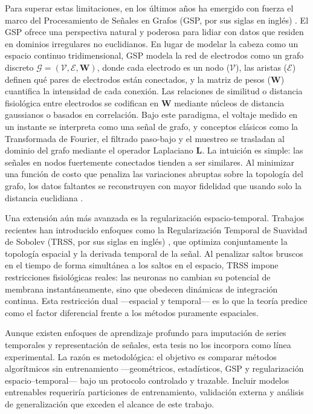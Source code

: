 Para superar estas limitaciones, en los últimos años ha emergido con fuerza el marco del Procesamiento de Señales en Grafos (GSP, por sus siglas en inglés) \cite{shuman2013,ortega2018}. El GSP ofrece una perspectiva natural y poderosa para lidiar con datos que residen en dominios irregulares no euclidianos. En lugar de modelar la cabeza como un espacio continuo tridimensional, GSP modela la red de electrodos como un grafo discreto $\mathcal{G} = (\mathcal{V}, \mathcal{E}, \mathbf{W})$, donde cada electrodo es un nodo ($\mathcal{V}$), las aristas ($\mathcal{E}$) definen qué pares de electrodos están conectados, y la matriz de pesos ($\mathbf{W}$) cuantifica la intensidad de cada conexión. Las relaciones de similitud o distancia fisiológica entre electrodos se codifican en $\mathbf{W}$ mediante núcleos de distancia gaussianos o basados en correlación.
Bajo este paradigma, el voltaje medido en un instante se interpreta como una señal de grafo, y conceptos clásicos como la Transformada de Fourier, el filtrado paso-bajo y el muestreo se trasladan al dominio del grafo mediante el operador Laplaciano $\mathbf{L}$. La intuición es simple: las señales en nodos fuertemente conectados tienden a ser similares. Al minimizar una función de costo que penaliza las variaciones abruptas sobre la topología del grafo, los datos faltantes se reconstruyen con mayor fidelidad que usando solo la distancia euclidiana \cite{narang2013}.

Una extensión aún más avanzada es la regularización espacio-temporal. Trabajos recientes han introducido enfoques como la Regularización Temporal de Suavidad de Sobolev (TRSS, por sus siglas en inglés) \cite{giraldo2022}, que optimiza conjuntamente la topología espacial y la derivada temporal de la señal. Al penalizar saltos bruscos en el tiempo de forma simultánea a los saltos en el espacio, TRSS impone restricciones fisiológicas reales: las neuronas no cambian su potencial de membrana instantáneamente, sino que obedecen dinámicas de integración continua. Esta restricción dual —espacial y temporal— es lo que la teoría predice como el factor diferencial frente a los métodos puramente espaciales.

Aunque existen enfoques de aprendizaje profundo para imputación de series temporales y representación de señales, esta tesis no los incorpora como línea experimental. La razón es metodológica: el objetivo es comparar métodos algorítmicos sin entrenamiento —geométricos, estadísticos, GSP y regularización espacio--temporal— bajo un protocolo controlado y trazable. Incluir modelos entrenables requeriría particiones de entrenamiento, validación externa y análisis de generalización que exceden el alcance de este trabajo.


